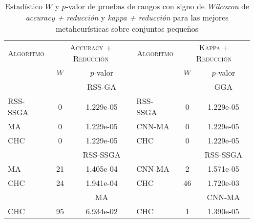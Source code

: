 \begin{table}[]
\centering
\begin{adjustbox}{max width =\textwidth}
\begin{tabular}{l c c|l c c}
\hline
	  \textsc{Algoritmo}
	& \multicolumn{2}{c}{\textsc{Accuracy + Reducción}}
	& \multicolumn{1}{|c}{\textsc{Algoritmo}}
	& \multicolumn{2}{c}{\textsc{Kappa +  Reducción}} \\
 & $W$ & $p$-valor & & $W$ & $p$-valor \\
\hline
\hline

 & & RSS-GA & & & GGA \\

RSS-SSGA & 0 & 1.229e-05 & RSS-SSGA & 0 & 1.229e-05 \\
MA & 0 & 1.229e-05 & CNN-MA & 0 & 1.229e-05  \\
CHC & 0 & 1.229e-05 & CHC & 0 & 1.229e-05 \\

\hline
 
 & & RSS-SSGA & & & RSS-SSGA \\

MA & 21 & 1.405e-04 & CNN-MA & 2 & 1.571e-05 \\
CHC & 24 & 1.941e-04 & CHC & 46 & 1.720e-03 \\

\hline

 & & MA & & & CNN-MA \\

CHC & 95 & 6.934e-02 & CHC & 1 & 1.390e-05 \\

\hline

\end{tabular}
\end{adjustbox}
\caption[Pruebas de \emph{Wilcoxon} entre las mejores metaheurísticas para los conjuntos pequeños sobre \emph{accuracy + reducción} y \emph{kappa + reducción}]{Estadístico $W$ y $p$-valor de pruebas de rangos con signo de \emph{Wilcoxon} de \emph{accuracy + reducción} y \emph{kappa + reducción} para las mejores metaheurísticas sobre conjuntos pequeños}
\label{wilcox2-all-peq}
\end{table}



